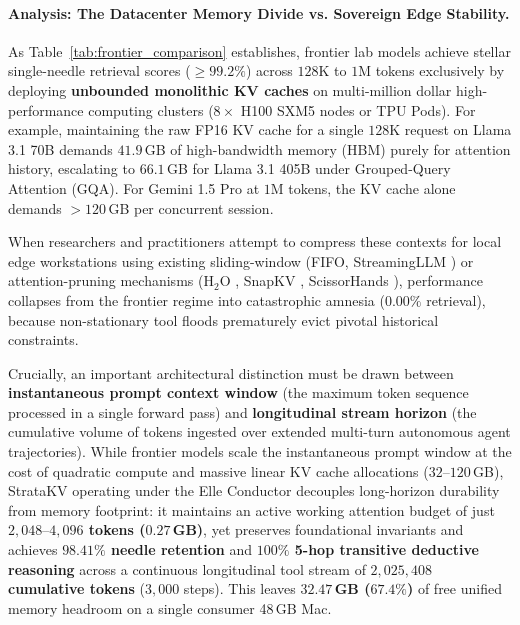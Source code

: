 \documentclass[11pt,letterpaper]{article}
\theoremstyle{definition}
\begin{document}
\paragraph{Analysis: The Datacenter Memory Divide vs. Sovereign Edge Stability.}
As Table~\ref{tab:frontier_comparison} establishes, frontier lab models achieve stellar single-needle retrieval scores ($\ge 99.2\%$) across $128\text{K}$ to $1\text{M}$ tokens exclusively by deploying \textbf{unbounded monolithic KV caches} on multi-million dollar high-performance computing clusters ($8\times$ H100 SXM5 nodes or TPU Pods). For example, maintaining the raw FP16 KV cache for a single $128\text{K}$ request on Llama 3.1 70B demands $41.9$\,GB of high-bandwidth memory (HBM) purely for attention history, escalating to $66.1$\,GB for Llama 3.1 405B under Grouped-Query Attention (GQA). For Gemini 1.5 Pro at $1\text{M}$ tokens, the KV cache alone demands $>120$\,GB per concurrent session. 

When researchers and practitioners attempt to compress these contexts for local edge workstations using existing sliding-window (FIFO, StreamingLLM \cite{xiao2023streamingllm}) or attention-pruning mechanisms (H$_2$O \cite{zhang2023h2o}, SnapKV \cite{li2024snapkv}, ScissorHands \cite{liu2023scissorhands}), performance collapses from the frontier regime into catastrophic amnesia ($0.00\%$ retrieval), because non-stationary tool floods prematurely evict pivotal historical constraints.

Crucially, an important architectural distinction must be drawn between \textbf{instantaneous prompt context window} (the maximum token sequence processed in a single forward pass) and \textbf{longitudinal stream horizon} (the cumulative volume of tokens ingested over extended multi-turn autonomous agent trajectories). While frontier models scale the instantaneous prompt window at the cost of quadratic compute and massive linear KV cache allocations ($32\text{--}120$\,GB), StrataKV operating under the Elle Conductor decouples long-horizon durability from memory footprint: it maintains an active working attention budget of just \textbf{$2,048\text{--}4,096$ tokens ($0.27$\,GB)}, yet preserves foundational invariants and achieves \textbf{$98.41\%$ needle retention} and \textbf{$100\%$ 5-hop transitive deductive reasoning} across a continuous longitudinal tool stream of \textbf{$2,025,408$ cumulative tokens} ($3,000$ steps). This leaves \textbf{$32.47$\,GB ($67.4\%$)} of free unified memory headroom on a single consumer 48\,GB Mac.
\end{document}
